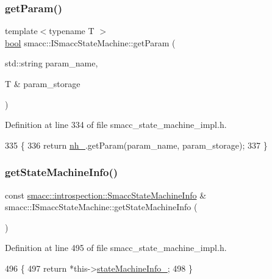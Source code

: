 \subsubsection{\texorpdfstring{get\+Param()}{getParam()}}
{\footnotesize\ttfamily template$<$typename T $>$ \\
\hyperlink{classbool}{bool} smacc\+::\+I\+Smacc\+State\+Machine\+::get\+Param (\begin{DoxyParamCaption}\item[{std\+::string}]{param\+\_\+name,  }\item[{T \&}]{param\+\_\+storage }\end{DoxyParamCaption})\hspace{0.3cm}{\ttfamily [protected]}}



Definition at line 334 of file smacc\+\_\+state\+\_\+machine\+\_\+impl.\+h.


\begin{DoxyCode}
335 \{
336   \textcolor{keywordflow}{return} \hyperlink{classsmacc_1_1ISmaccStateMachine_ad8877bcca9dbb345fe72cca839c93dd3}{nh\_}.getParam(param\_name, param\_storage);
337 \}
\end{DoxyCode}
\mbox{\label{classsmacc_1_1ISmaccStateMachine_a3b1facb0477325fe43b447fc21d9eb7d}} 
\subsubsection{\texorpdfstring{get\+State\+Machine\+Info()}{getStateMachineInfo()}}
{\footnotesize\ttfamily const \hyperlink{classsmacc_1_1introspection_1_1SmaccStateMachineInfo}{smacc\+::introspection\+::\+Smacc\+State\+Machine\+Info} \& smacc\+::\+I\+Smacc\+State\+Machine\+::get\+State\+Machine\+Info (\begin{DoxyParamCaption}{ }\end{DoxyParamCaption})\hspace{0.3cm}{\ttfamily [inline]}}



Definition at line 495 of file smacc\+\_\+state\+\_\+machine\+\_\+impl.\+h.


\begin{DoxyCode}
496 \{
497   \textcolor{keywordflow}{return} *this->\hyperlink{classsmacc_1_1ISmaccStateMachine_a0914aa27c3f51374c338d89a32b135d1}{stateMachineInfo\_};
498 \}
\end{DoxyCode}
\mbox{\label{classsmacc_1_1ISmaccStateMachine_a2d0b1742f17dd77d5df217153e8b5259}} 
